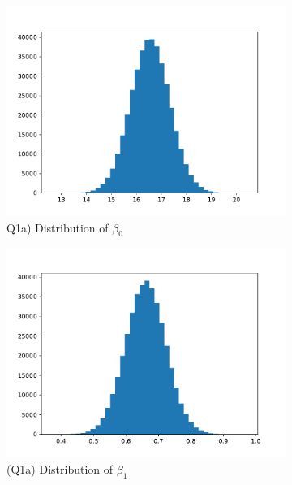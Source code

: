 \documentclass{homeworg}
\begin{document}
\begin{figure}[H]
	\caption{Q1(a) Parameter Histogram}
\begin{subfigure}{0.48\textwidth}
	\centering
	\includegraphics[width=\textwidth]{q1_a_beta0.pdf}
	\caption{Q1a) Distribution of $\beta_0$}
\end{subfigure}
\begin{subfigure}{0.48\textwidth}
	\centering
	\includegraphics[width=\textwidth]{q1_a_beta1.pdf}
	\caption{(Q1a) Distribution of $\beta_1$}
\end{subfigure}
	\begin{subfigure}{0.48\textwidth}
	\centering

\end{subfigure}
\end{figure}
\end{document}
